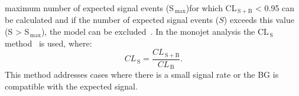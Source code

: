 maximum number of expected signal events (S$_\mathrm{\, max}$)for which
CL$_\mathrm{\, S+B}$ < 0.95 can be calculated and if the number of expected
signal events ($S$) exceeds this value (S > S$_\mathrm{\, max}$), the model can
be excluded~\cite{PawelThesis}. In the monojet analysis the CL$_\mathrm{\, S}$
method~\cite{CLsMethod} is used, where:
\begin{equation}
  \label{eq:89}
  CL_\mathrm{\, S} = \frac{CL_\mathrm{\, S+B}}{CL_\mathrm{\, B}}.
\end{equation}
This method addresses cases where there is a small signal rate or the BG is
compatible with the expected signal.
